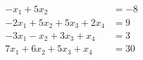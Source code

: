 %
\begin{align*}
-x_1+5x_2&=-8\\
-2x_1+5x_2+5x_3+2x_4&=9\\
-3x_1-x_2+3x_3+x_4&=3\\
7x_1+6x_2+5x_3+x_4&=30
\end{align*}
%
